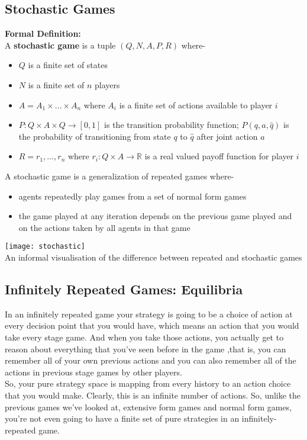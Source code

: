 \subsection{Stochastic Games}
\textbf{Formal Definition:}\\
\newline
A \textbf{stochastic game} is a tuple $(Q, N, A, P, R)$ where-
 
\begin{itemize}
\item $Q$ is a finite set of states
\item $N$ is a finite set of $n$ players
\item $A = A_1 \times \dots \times A_n$ where $A_i$ is a finite set of actions available to player $i$
\item $P: Q \times A \times Q\to [0,1]$ is the transition probability function; $P(q, a, \hat q)$ is the probability of transitioning from state $q$ to $\hat q$ after joint action $a$
\item $R = r_1, \dots, r_n$ where $r_i:  Q \times A \to \mathbb{R}$ is a real valued payoff function for player $i$
\end{itemize}
A stochastic game is a generalization of repeated games where-
\begin{itemize}
\item agents repeatedly play games from a set of normal form games
\item the game played at any iteration depends on the previous game played and on the actions taken by all agents in that game
\end{itemize}
 \begin{center}
\texttt{[image: stochastic]}\\
An informal visualisation of the  difference between repeated and stochastic games
\end{center}
\subsection{Infinitely Repeated Games: Equilibria}
In an infinitely repeated game your strategy is going to be a choice of action at every decision point that you would have, which means an action that you would take every stage game. And when you take those actions, you actually get to reason about everything that you've seen before in the game ,that is, you can remember all of your own previous actions and you can also remember all of the actions in previous stage games by other players.\\
\newline
So, your pure strategy space is mapping from every history to an action choice that you would make. Clearly, this is an infinite number of actions. So, unlike the previous games we've looked at, extensive form games and normal form games, you're not even going to have a finite set of pure strategies in an infinitely-repeated game.

